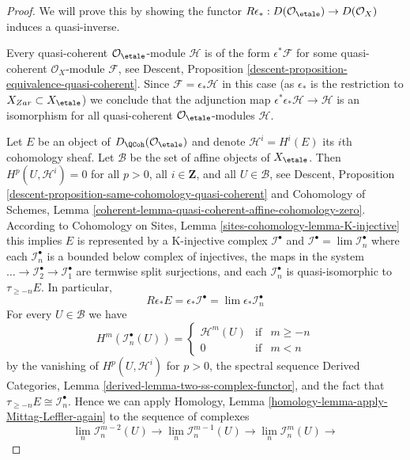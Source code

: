 \begin{proof}
We will prove this by showing the functor
$R\epsilon_* : D(\mathcal{O}_\etale) \to D(\mathcal{O}_X)$
induces a quasi-inverse.

\medskip\noindent
Every quasi-coherent $\mathcal{O}_\etale$-module
$\mathcal{H}$ is of the form $\epsilon^*\mathcal{F}$ for some quasi-coherent
$\mathcal{O}_X$-module $\mathcal{F}$, see
Descent, Proposition \ref{descent-proposition-equivalence-quasi-coherent}.
Since $\mathcal{F} = \epsilon_*\mathcal{H}$ in this case
(as $\epsilon_*$ is the restriction to $X_{Zar} \subset X_\etale$)
we conclude that the adjunction map
$\epsilon^*\epsilon_*\mathcal{H} \to \mathcal{H}$ is an isomorphism for all
quasi-coherent $\mathcal{O}_\etale$-modules $\mathcal{H}$.

\medskip\noindent
Let $E$ be an object of $D_\QCoh(\mathcal{O}_\etale)$
and denote $\mathcal{H}^i = H^i(E)$ its $i$th cohomology
sheaf. Let $\mathcal{B}$ be the set of affine objects of $X_\etale$.
Then $H^p(U, \mathcal{H}^i) = 0$ for all $p > 0$, all $i \in \mathbf{Z}$,
and all $U \in \mathcal{B}$, see
Descent, Proposition \ref{descent-proposition-same-cohomology-quasi-coherent}
and
Cohomology of Schemes, Lemma
\ref{coherent-lemma-quasi-coherent-affine-cohomology-zero}.
According to
Cohomology on Sites, Lemma \ref{sites-cohomology-lemma-K-injective}
this implies $E$ is represented by a K-injective complex
$\mathcal{I}^\bullet$ and
$\mathcal{I}^\bullet = \lim \mathcal{I}_n^\bullet$ where
each $\mathcal{I}_n^\bullet$ is a bounded below complex of injectives,
the maps in the system
$\ldots \to \mathcal{I}_2^\bullet \to \mathcal{I}_1^\bullet$
are termwise split surjections, and each $\mathcal{I}_n^\bullet$ is
quasi-isomorphic to $\tau_{\geq -n}E$.
In particular,
$$
R\epsilon_*E = \epsilon_*\mathcal{I}^\bullet =
\lim \epsilon_*\mathcal{I}_n^\bullet
$$
For every $U \in \mathcal{B}$ we have
$$
H^m(\mathcal{I}_n^\bullet(U)) =
\left\{
\begin{matrix}
\mathcal{H}^m(U) & \text{if} & m \geq -n \\
0 & \text{if} & m < n
\end{matrix}
\right.
$$
by the vanishing of $H^p(U, \mathcal{H}^i)$ for $p > 0$,
the spectral sequence
Derived Categories, Lemma \ref{derived-lemma-two-ss-complex-functor}, and
the fact that $\tau_{\geq -n}E \cong \mathcal{I}_n^\bullet$. Hence we can apply
Homology, Lemma \ref{homology-lemma-apply-Mittag-Leffler-again}
to the sequence of complexes
$$
\lim_n \mathcal{I}_n^{m - 2}(U) \to
\lim_n \mathcal{I}_n^{m - 1}(U) \to
\lim_n \mathcal{I}_n^m(U) \to
$$
\end{proof}
